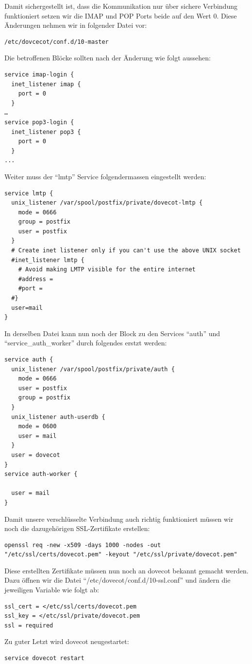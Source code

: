 Damit sichergestellt ist, dass die Kommunikation nur über sichere Verbindung funktioniert setzen wir die IMAP und POP Ports beide auf den Wert 0. Diese Änderungen nehmen wir in folgender Datei vor:

\begin{lstlisting}
/etc/dovcecot/conf.d/10-master
\end{lstlisting}

Die betroffenen Blöcke sollten nach der Änderung wie folgt aussehen:

\begin{lstlisting}
service imap-login {
  inet_listener imap {
    port = 0
  }
…
service pop3-login {
  inet_listener pop3 {
    port = 0
  }
...
\end{lstlisting}

Weiter muss der ``lmtp'' Service folgendermassen eingestellt werden:

\begin{lstlisting}
service lmtp {
  unix_listener /var/spool/postfix/private/dovecot-lmtp {
    mode = 0666
    group = postfix
    user = postfix
  }
  # Create inet listener only if you can't use the above UNIX socket
  #inet_listener lmtp {
    # Avoid making LMTP visible for the entire internet
    #address =
    #port =
  #}
  user=mail
}
\end{lstlisting}

In derselben Datei kann nun noch der Block zu den Services ``auth'' und ``service_auth_worker'' durch folgendes erstzt werden:

\begin{lstlisting}
service auth {
  unix_listener /var/spool/postfix/private/auth {
    mode = 0666
    user = postfix
    group = postfix
  }
  unix_listener auth-userdb {
    mode = 0600
    user = mail
  }
  user = dovecot
}
service auth-worker {

  user = mail
}
\end{lstlisting}

Damit unsere verschlüsselte Verbindung auch richtig funktioniert müssen wir noch die dazugehörigen SSL-Zertifikate erstellen:

\begin{lstlisting}
openssl req -new -x509 -days 1000 -nodes -out "/etc/ssl/certs/dovecot.pem" -keyout "/etc/ssl/private/dovecot.pem"
\end{lstlisting}

Diese erstellten Zertifikate müssen nun noch an dovecot bekannt gemacht werden. Dazu öffnen wir die Datei ``/etc/dovecot/conf.d/10-ssl.conf'' und ändern die jeweiligen Variable wie folgt ab:

\begin{lstlisting}
ssl_cert = </etc/ssl/certs/dovecot.pem
ssl_key = </etc/ssl/private/dovecot.pem
ssl = required
\end{lstlisting}

Zu guter Letzt wird dovecot neugestartet:

\begin{lstlisting}
service dovecot restart
\end{lstlisting}